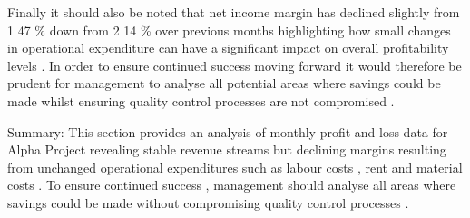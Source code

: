 Finally it should also be noted that net income margin has declined slightly from 1 47 \% down from 2 14 \% over previous months highlighting how small changes in operational expenditure can have a significant impact on overall profitability levels . In order to ensure continued success moving forward it would therefore be prudent for management to analyse all potential areas where savings could be made whilst ensuring quality control processes are not compromised . 

Summary: This section provides an analysis of monthly profit and loss data for Alpha Project revealing stable revenue streams but declining margins resulting from unchanged operational expenditures such as labour costs , rent and material costs . To ensure continued success , management should analyse all areas where savings could be made without compromising quality control processes .